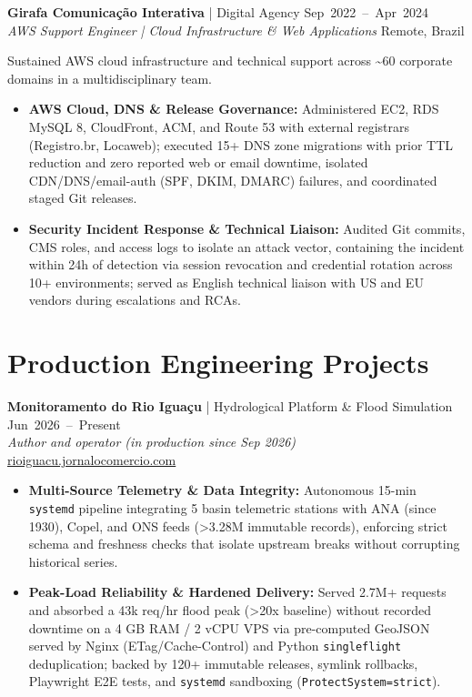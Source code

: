 \documentclass[10pt,a4paper]{article}
\begin{document}
\vspace{3pt}
\textbf{Girafa Comunicação Interativa} | Digital Agency \hfill \mbox{Sep 2022 -- Apr 2024} \\
\textit{AWS Support Engineer | Cloud Infrastructure \& Web Applications} \hfill Remote, Brazil

Sustained AWS cloud infrastructure and technical support across \textasciitilde{}60 corporate domains in a multidisciplinary team.
\begin{itemize}[topsep=1.5pt]
    \item \textbf{AWS Cloud, DNS \& Release Governance:} Administered EC2, RDS MySQL 8, CloudFront, ACM, and Route 53 with external registrars (Registro.br, Locaweb); executed 15+ DNS zone migrations with prior TTL reduction and zero reported web or email downtime, isolated \mbox{CDN/DNS/email-auth} (SPF, DKIM, DMARC) failures, and coordinated staged Git releases.
    \item \textbf{Security Incident Response \& Technical Liaison:} Audited Git commits, CMS roles, and access logs to isolate an attack vector, containing the incident within 24h of detection via session revocation and credential rotation across 10+ environments; served as English technical liaison with US and EU vendors during escalations and RCAs.
\end{itemize}

\section{Production Engineering Projects}

\textbf{Monitoramento do Rio Iguaçu} | Hydrological Platform \& Flood Simulation \hfill \mbox{Jun 2026 -- Present} \\
\textit{Author and operator (in production since Sep 2026)} \hfill \href{https://rioiguacu.jornalocomercio.com}{rioiguacu.jornalocomercio.com}
\begin{itemize}[topsep=1.5pt]
    \item \textbf{\mbox{Multi-Source} Telemetry \& Data Integrity:} Autonomous \mbox{15-min} \texttt{systemd} pipeline integrating 5 basin telemetric stations with ANA (since 1930), Copel, and ONS feeds (>3.28M immutable records), enforcing strict schema and freshness checks that isolate upstream breaks without corrupting historical series.
    \item \textbf{\mbox{Peak-Load} Reliability \& Hardened Delivery:} Served 2.7M+ requests and absorbed a 43k req/hr flood peak (>20x baseline) without recorded downtime on a 4 GB RAM / 2 vCPU VPS via \mbox{pre-computed} GeoJSON served by Nginx (\mbox{ETag/Cache-Control}) and Python \texttt{singleflight} deduplication; backed by 120+ immutable releases, symlink rollbacks, Playwright E2E tests, and \texttt{systemd} sandboxing (\mbox{\texttt{ProtectSystem=strict}}).
\end{itemize}
\end{document}
